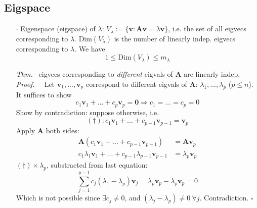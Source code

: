 \documentclass[a4paper, 11pt]{article}
\begin{document}
\subsection{Eigspace}
\begin{itemize}
  \item[$\cdot$] Eigenspace (eigspace) of $\lambda$: $V_{\lambda}:=\{\pmb{v}: \pmb{A}\pmb{v}=\lambda \pmb{v}\}$, i.e. the set of all eigvecs corresponding to $\lambda$. $\text{Dim}(V_{\lambda})$ is the number of linearly indep. eigvecs corresponding to $\lambda$. We have
  $$
  1\leq \text{Dim}(V_{\lambda})\leq m_{\lambda}
  $$
  \item[\textit{Thm.~}] eigvecs corresponding to \textit{different} eigvals of $\pmb{A}$ are linearly indep.\\
  \textit{Proof.~~} Let $\pmb{v}_1, ..., \pmb{v}_p$ correspond to different eigvals of $\pmb{A}$: $\lambda_1, ..., \lambda_p$ ($p\leq n$).\\
  It suffices to show
  $$
  c_1 \pmb{v}_1 + ... + c_p \pmb{v}_p= \pmb{0} \Rightarrow c_1=...=c_p=0
  $$
  Show by contradiction: suppose otherwise, i.e. 
  $$
  (\dag): c_1 \pmb{v}_1 + ... + c_{p-1} \pmb{v}_{p-1}= \pmb{v}_p
  $$
  Apply $\pmb{A}$ both sides:
  \begin{equation*}
  \begin{split}
    \pmb{A}(c_1 \pmb{v}_1 + ... + c_{p-1} \pmb{v}_{p-1}) &= \pmb{A} \pmb{v}_p\\
    c_1 \lambda_1 \pmb{v}_1 + ... + c_{p-1} \lambda_{p-1} \pmb{v}_{p-1} &= \lambda_p \pmb{v}_p
  \end{split}
  \end{equation*}
  $(\dag)\times \lambda_p$, substracted from last equation:
  $$
  \sum_{j=1}^{p-1}c_j (\lambda_1 - \lambda_p)\pmb{v}_j = \lambda_p \pmb{v}_p - \lambda_p \pmb{v}_p = 0
  $$
  Which is not possible since $\exists c_j \ne 0$, and $(\lambda_j - \lambda_p)\ne 0~\forall j$. Contradiction. $\square$
\end{itemize}
\end{document}

